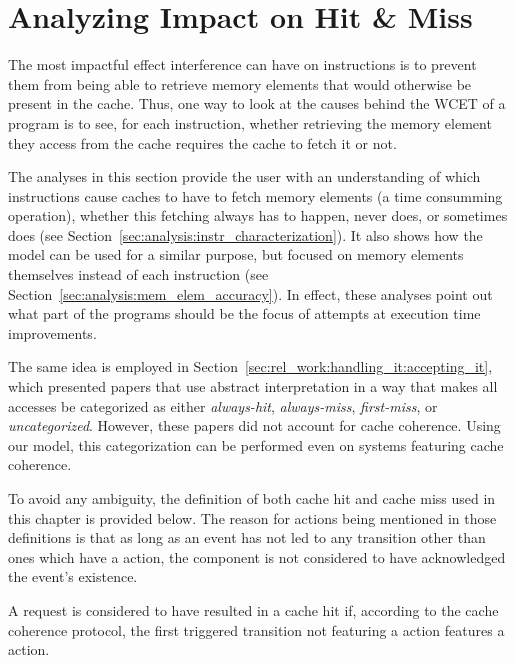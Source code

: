 \section{Analyzing Impact on Hit \& Miss}
\label{sec:analysis:hit_and_miss}
The most impactful effect interference can have on instructions is to prevent
them from being able to retrieve memory elements that would otherwise be
present in the cache. Thus, one way to look at the causes behind the WCET of a
program is to see, for each instruction, whether retrieving the memory element
they access from the cache requires the cache to fetch it or not.

The analyses in this section provide the user with an understanding of which
instructions cause caches to have to fetch memory elements (a time consumming
operation), whether this fetching always has to happen, never does, or
sometimes does (see Section~\ref{sec:analysis:instr_characterization}). It also
shows how the model can be used for a similar purpose, but focused on memory
elements themselves instead of each instruction (see
Section~\ref{sec:analysis:mem_elem_accuracy}). In effect, these analyses point
out what part of the programs should be the focus of attempts at execution time
improvements.

The same idea is employed in
Section~\ref{sec:rel_work:handling_it:accepting_it}, which presented papers
that use abstract interpretation in a way that makes all accesses be
categorized as either \textit{always-hit}, \textit{always-miss},
\textit{first-miss}, or \textit{uncategorized}. However, these papers did not
account for cache coherence. Using our model, this categorization can be
performed even on systems featuring cache coherence.

To avoid any ambiguity, the definition of both cache hit and cache miss used in
this chapter is provided below. The reason for \stallact{} actions being
mentioned in those definitions is that as long as an event has not led to any
transition other than ones which have a \stallact{} action, the component is not
considered to have acknowledged the event's existence.

\begin{definition}
\label{def:cache_hit}
A request is considered to have resulted in a cache hit if, according to the
cache coherence protocol, the first triggered transition not featuring a
\stallact{} action features a \hitact{} action.
\end{definition}


